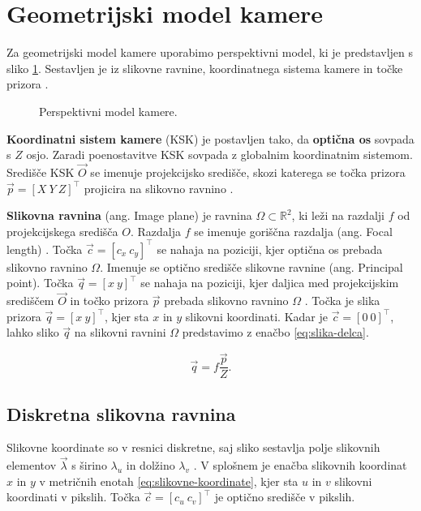 \section{Geometrijski model kamere}\label{sec:model-kamere}
Za geometrijski model kamere uporabimo perspektivni model, ki je predstavljen s sliko \ref{fig:perspektivni-model}. Sestavljen je iz slikovne ravnine, koordinatnega sistema kamere in točke prizora \cite{trucco1998introductory}.


\begin{figure}[htb]
\centering

\caption[Perspektivni model kamere]{Perspektivni model kamere.}
\label{fig:perspektivni-model}
\end{figure}


\textbf{Koordinatni sistem kamere} (KSK) je postavljen tako, da \textbf{optična os} sovpada s $Z$ osjo. Zaradi poenostavitve KSK sovpada z globalnim koordinatnim sistemom.  Središče KSK $\vec{O}$ se imenuje projekcijsko središče, skozi katerega se točka prizora $\vec{p} = \left[ X~Y~Z \right]^\top$ projicira na slikovno ravnino \cite{trucco1998introductory}.

\textbf{Slikovna ravnina} (ang. Image plane) je ravnina $\mathit{\Omega} \subset \mathbb{R}^2$, ki leži na razdalji $f$ od projekcijskega središča $O$. Razdalja $f$ se imenuje goriščna razdalja (ang. Focal length) \cite{trucco1998introductory}. Točka $\vec{c} = \left[c_x~c_y \right]^\top$ se nahaja na poziciji, kjer optična os prebada slikovno ravnino $\mathit{\Omega}$. Imenuje se optično središče slikovne ravnine (ang. Principal point). Točka $\vec{q} = [x~y]^\top$ se nahaja na poziciji, kjer daljica med projekcijskim središčem $\vec{O}$ in točko prizora $\vec{p}$ prebada slikovno ravnino $\mathit{\Omega}$ \cite{trucco1998introductory}. Točka je slika prizora $\vec{q} = [x~y]^\top$, kjer sta $x$ in $y$ slikovni koordinati. Kadar je $\vec{c} = \left[0~0\right]^\top$, lahko sliko $\vec{q}$ na slikovni ravnini $\mathit{\Omega}$ predstavimo z enačbo \eqref{eq:slika-delca}.

\begin{equation}
	\vec{q} = f \frac{\vec{p}}{Z}.
    \label{eq:slika-delca}
\end{equation}

\subsection{Diskretna slikovna ravnina}
Slikovne koordinate so v resnici diskretne, saj sliko sestavlja polje slikovnih elementov $\vec{\lambda}$ s širino $\lambda_u$ in dolžino $\lambda_v$ \cite{trucco1998introductory}. V splošnem je enačba slikovnih koordinat $x$ in $y$ v metričnih enotah \eqref{eq:slikovne-koordinate}, kjer sta $u$ in $v$ slikovni koordinati v pikslih. Točka $\vec{c} = \left[c_u~c_v \right]^\top$ je optično središče v pikslih.

